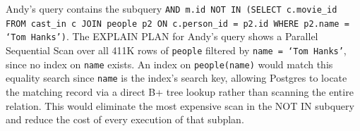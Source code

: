 \documentclass[12pt,letterpaper, onecolumn]{exam}
\begin{document}
\begin{questions}
\begin{parts}
\begin{solution}
    Andy's query contains the subquery \texttt{AND m.id NOT IN (SELECT c.movie\_id FROM cast\_in c JOIN people p2 ON c.person\_id = p2.id WHERE p2.name = `Tom Hanks')}. The EXPLAIN PLAN for Andy's query shows a Parallel Sequential Scan over all 411K rows of \texttt{people} filtered by \texttt{name = `Tom Hanks'}, since no index on \texttt{name} exists. An index on \texttt{people(name)} would match this equality search since \texttt{name} is the index's search key, allowing Postgres to locate the matching record via a direct B+ tree lookup rather than scanning the entire relation. This would eliminate the most expensive scan in the NOT IN subquery and reduce the cost of every execution of that subplan.
  \end{solution}
  \end{parts}
\end{questions}
\end{document}
